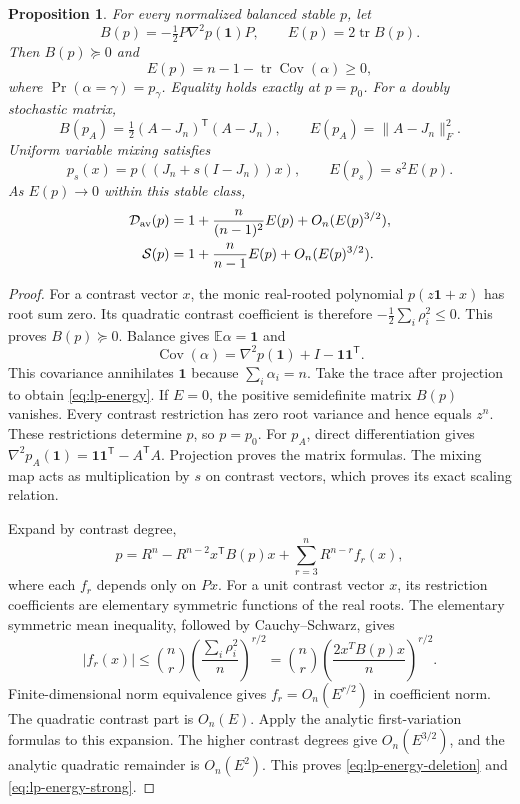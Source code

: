 \documentclass[11pt,a4paper]{article}
\newtheorem{proposition}[theorem]{Proposition}
\theoremstyle{definition}
\theoremstyle{remark}
\newcommand{\T}{\mathsf{T}}
\begin{document}
\begin{proposition}\label{prop:lp-energy}
For every normalized balanced stable $p$, let
\[
 B(p)=-\tfrac12P\nabla^2p(\mathbf1)P,\qquad E(p)=2\operatorname{tr}B(p).
\]
Then $B(p)\succeq0$ and
\begin{equation}\label{eq:lp-energy}
 E(p)=n-1-\operatorname{tr}\operatorname{Cov}(\alpha)\ge0,
\end{equation}
where $\Pr(\alpha=\gamma)=p_\gamma$.
Equality holds exactly at $p=p_0$.
For a doubly stochastic matrix,
\[
 B(p_A)=\tfrac12(A-J_n)^\T(A-J_n),\qquad E(p_A)=\|A-J_n\|_F^2.
\]
Uniform variable mixing satisfies
\[
 p_s(x)=p((J_n+s(I-J_n))x),\qquad E(p_s)=s^2E(p).
\]
As $E(p)\to0$ within this stable class,
\begin{align}
 \mathcal D_{\rm av}(p)&=1+\frac{n}{(n-1)^2}E(p)+O_n(E(p)^{3/2}),\label{eq:lp-energy-deletion}\\
 \mathcal S(p)&=1+\frac{n}{n-1}E(p)+O_n(E(p)^{3/2}).\label{eq:lp-energy-strong}
\end{align}
\end{proposition}
\begin{proof}
For a contrast vector $x$, the monic real-rooted polynomial $p(z\mathbf1+x)$ has root sum zero.
Its quadratic contrast coefficient is therefore $-\tfrac12\sum_i\rho_i^2\le0$.
This proves $B(p)\succeq0$.
Balance gives $\mathbb E\alpha=\mathbf1$ and
\[
 \operatorname{Cov}(\alpha)=\nabla^2p(\mathbf1)+I-\mathbf1\mathbf1^\T.
\]
This covariance annihilates $\mathbf1$ because $\sum_i\alpha_i=n$.
Take the trace after projection to obtain \eqref{eq:lp-energy}.
If $E=0$, the positive semidefinite matrix $B(p)$ vanishes.
Every contrast restriction has zero root variance and hence equals $z^n$.
These restrictions determine $p$, so $p=p_0$.
For $p_A$, direct differentiation gives $\nabla^2p_A(\mathbf1)=\mathbf1\mathbf1^\T-A^\T A$.
Projection proves the matrix formulas.
The mixing map acts as multiplication by $s$ on contrast vectors, which proves its exact scaling relation.

Expand by contrast degree,
\[
 p=R^n-R^{n-2}x^\T B(p)x+\sum_{r=3}^nR^{n-r}f_r(x),
\]
where each $f_r$ depends only on $Px$.
For a unit contrast vector $x$, its restriction coefficients are elementary symmetric functions of the real roots.
The elementary symmetric mean inequality, followed by Cauchy--Schwarz, gives
\[
 |f_r(x)|\le\binom nr
 \left(\frac{\sum_i\rho_i^2}{n}\right)^{r/2}
 =\binom nr\left(\frac{2x^TB(p)x}{n}\right)^{r/2}.
\]
Finite-dimensional norm equivalence gives $f_r=O_n(E^{r/2})$ in coefficient norm.
The quadratic contrast part is $O_n(E)$.
Apply the analytic first-variation formulas to this expansion.
The higher contrast degrees give $O_n(E^{3/2})$, and the analytic quadratic remainder is $O_n(E^2)$.
This proves \eqref{eq:lp-energy-deletion} and \eqref{eq:lp-energy-strong}.
\end{proof}
\end{document}
